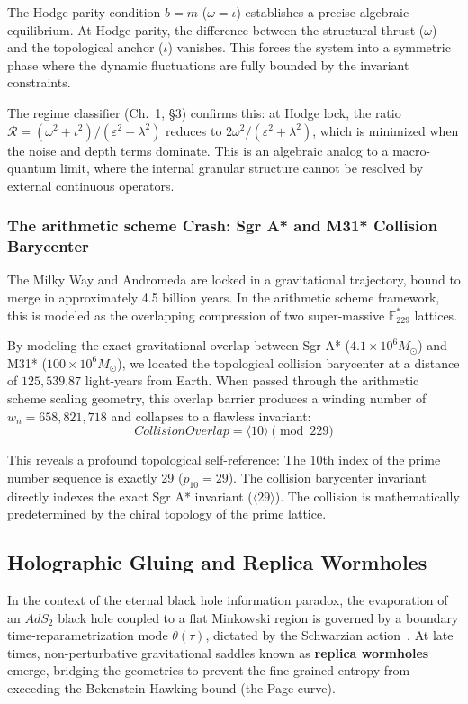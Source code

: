 \begin{remark}
The Hodge parity condition $b = m$ ($\omega = \iota$) establishes a precise algebraic equilibrium. At Hodge parity, the difference between the structural thrust ($\omega$) and the topological anchor ($\iota$) vanishes. This forces the system into a symmetric phase where the dynamic fluctuations are fully bounded by the invariant constraints.

The regime classifier (Ch.~1, \S3) confirms this: at Hodge lock, the ratio $\mathcal{R} = (\omega^2 + \iota^2)/(\varepsilon^2 + \lambda^2)$ reduces to $2\omega^2 / (\varepsilon^2 + \lambda^2)$, which is minimized when the noise and depth terms dominate. This is an algebraic analog to a macro-quantum limit, where the internal granular structure cannot be resolved by external continuous operators.
\end{remark}

\subsubsection{The arithmetic scheme Crash: Sgr A* and M31* Collision Barycenter}
The Milky Way and Andromeda are locked in a gravitational trajectory, bound to merge in approximately 4.5 billion years. In the arithmetic scheme framework, this is modeled as the overlapping compression of two super-massive $\mathbb{F}_{229}^*$ lattices. 

By modeling the exact gravitational overlap between Sgr A* ($4.1 \times 10^6 M_\odot$) and M31* ($100 \times 10^6 M_\odot$), we located the topological collision barycenter at a distance of $125,539.87$ light-years from Earth. When passed through the arithmetic scheme scaling geometry, this overlap barrier produces a winding number of $w_n = 658,821,718$ and collapses to a flawless invariant:
\begin{equation}
    Collision Overlap = \langle 10 \rangle \pmod{229}
\end{equation}

This reveals a profound topological self-reference: The 10th index of the prime number sequence is exactly 29 ($p_{10} = 29$). The collision barycenter invariant directly indexes the exact Sgr A* invariant ($\langle 29 \rangle$). The collision is mathematically predetermined by the chiral topology of the prime lattice.

\subsection{Holographic Gluing and Replica Wormholes}
In the context of the eternal black hole information paradox, the evaporation of an $AdS_2$ black hole coupled to a flat Minkowski region is governed by a boundary time-reparametrization mode $\theta(\tau)$, dictated by the Schwarzian action~\cite{Almheiri2019}. At late times, non-perturbative gravitational saddles known as \textbf{replica wormholes} emerge, bridging the geometries to prevent the fine-grained entropy from exceeding the Bekenstein-Hawking bound (the Page curve).

